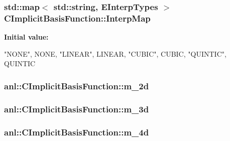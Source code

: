 \hypertarget{classanl_1_1CImplicitBasisFunction_abdee5a732a3ef68456a3c7e6e9c38320}{
\subsubsection[{InterpMap}]{\setlength{\rightskip}{0pt plus 5cm}std::map$<$ std::string, {\bf EInterpTypes} $>$ {\bf CImplicitBasisFunction::InterpMap}}}
\label{classanl_1_1CImplicitBasisFunction_abdee5a732a3ef68456a3c7e6e9c38320}
{\bfseries Initial value:}
\begin{DoxyCode}
 {
    {"NONE", NONE},
    {"LINEAR", LINEAR},
    {"CUBIC", CUBIC},
    {"QUINTIC", QUINTIC}
}
\end{DoxyCode}
\hypertarget{classanl_1_1CImplicitBasisFunction_a912c32d0c8ea3bec56cd6053dca38645}{
\subsubsection[{m\_\-2d}]{ {\bf anl::CImplicitBasisFunction::m\_\-2d}}}
\label{classanl_1_1CImplicitBasisFunction_a912c32d0c8ea3bec56cd6053dca38645}
\hypertarget{classanl_1_1CImplicitBasisFunction_a413203dc10d821e6884782ec4474cd28}{
\subsubsection[{m\_\-3d}]{ {\bf anl::CImplicitBasisFunction::m\_\-3d}}}
\label{classanl_1_1CImplicitBasisFunction_a413203dc10d821e6884782ec4474cd28}
\hypertarget{classanl_1_1CImplicitBasisFunction_afacdd14c7ff8c9dcfd9847b87ae2e250}{
\subsubsection[{m\_\-4d}]{ {\bf anl::CImplicitBasisFunction::m\_\-4d}}}
